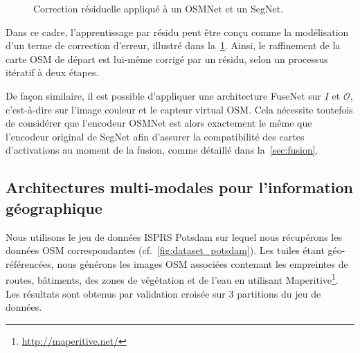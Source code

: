 \begin{figure}[h]
  \resizebox{\textwidth}{!}{}
  \caption{Correction résiduelle appliqué à un OSMNet et un SegNet.}
  \label{fig:refinet}
\end{figure}

Dans ce cadre, l'apprentissage par résidu peut être conçu comme la modélisation d'un terme de correction d'erreur, illustré dans la~\cref{fig:refinet}. Ainsi, le raffinement de la carte \gls{OSM} de départ est lui-même corrigé par un résidu, selon un processus itératif à deux étapes.

De façon similaire, il est possible d'appliquer une architecture FuseNet sur $I$ et $\mathcal{O}$, c'est-à-dire sur l'image couleur et le capteur virtual \gls{OSM}. Cela nécessite toutefois de considérer que l'encodeur OSMNet est alors exactement le même que l'encodeur original de SegNet afin d'assurer la compatibilité des cartes d'activations au moment de la fusion, comme détaillé dans la~\cref{sec:fusion}.

\subsection{Architectures multi-modales pour l'information géographique}

Nous utilisons le jeu de données \gls{ISPRS} Potsdam sur lequel nous récupérons les données \gls{OSM} correspondantes (cf.~\cref{fig:dataset_potsdam}). Les tuiles étant géo-référencées, nous générons les images \gls{OSM} associées contenant les empreintes de routes, bâtiments, des zones de végétation et de l'eau en utilisant Maperitive\footnote{\url{http://maperitive.net/}}. Les résultats sont obtenus par validation croisée sur 3 partitions du jeu de données.


